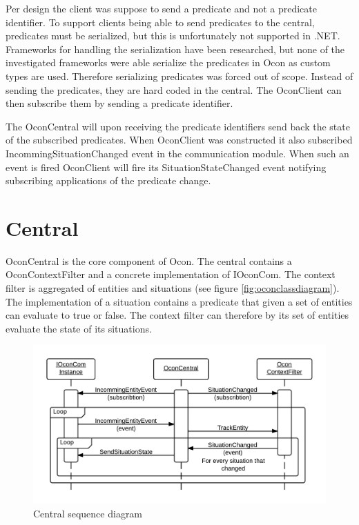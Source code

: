 \documentclass[../report.tex]{subfiles}
\begin{document}
Per design the client was suppose to send a predicate and not a predicate identifier. To support clients being able to send predicates to the central, predicates must be serialized, but this is unfortunately not supported in .NET. Frameworks for handling the serialization have been researched, but none of the investigated frameworks were able serialize the predicates in Ocon as custom types are used. Therefore serializing predicates was forced out of scope. Instead of sending the predicates, they are hard coded in the central. The OconClient can then subscribe them by sending a predicate identifier. 


The OconCentral will upon receiving the predicate identifiers send back the state of the subscribed predicates. When OconClient was constructed it also subscribed IncommingSituationChanged event in the communication module. When such an event is fired OconClient will fire its SituationStateChanged event notifying subscribing applications of the predicate change.


\section{Central}
OconCentral is the core component of Ocon. The central contains a OconContextFilter and a concrete implementation of IOconCom. The context filter is aggregated of entities and situations (see figure \ref{fig:oconclassdiagram}). The implementation of a situation contains a predicate that given a set of entities can evaluate to true or false. The context filter can therefore by its set of entities evaluate the state of its situations.

\begin{figure}
\centering
\includegraphics[width=\linewidth]{sequencediagram-central.png}
\caption{Central sequence diagram}
\label{fig:seqcentral}
\end{figure}
\end{document}
